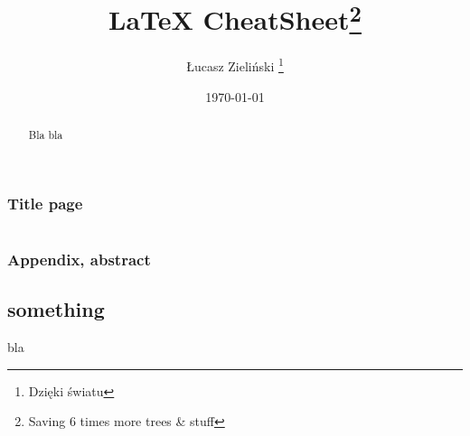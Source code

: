\subsection{Title page}
\begin{minipage}[t]{0.49\textwidth}
\begin{latex}
\title{\LaTeX{} CheatSheet\footnote{
    Saving 6 times more trees \& stuff}}
\author{\L{}ucasz Zieli\'nski
 \thanks{Dzi\k{e}ki \'swiatu}}
\date{\today}
\begin{titlepage} 
 \maketitle 
\end{titlepage}
\end{latex}
\end{minipage}
\hfill
{}
\hfill
\(\)%

\subsection{Appendix, abstract}
\begin{latex}
\appendix
\chapter{something}
bla

\begin{abstract}
Bla bla
\end{abstract}
\end{latex}
\newpage
